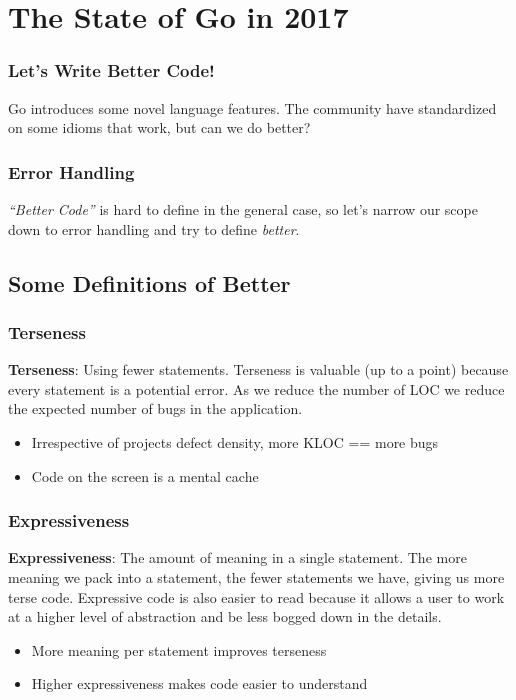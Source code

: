 \documentclass{beamer}
\begin{document}
\section{The State of Go in 2017}

\begin{frame}
  \frametitle{Let's Write Better Code!}
  Go introduces some novel language features.  The community have
  standardized on some idioms that work, but can we do better?
\end{frame}

\begin{frame}
  \frametitle{Error Handling}
  {\it ``Better Code''} is hard to define in the general case, so let's
  narrow our scope down to error handling and try to define
  {\it better}.
\end{frame}

\subsection{Some Definitions of Better}
\begin{frame}
  \frametitle{Terseness}
  {\bf Terseness}: Using fewer statements.
  \vfill
  Terseness is valuable (up to a point) because every statement is a
  potential error.  As we reduce the number of LOC we reduce the
  expected number of bugs in the application.
  \vfill
  \begin{itemize}
  \item Irrespective of projects defect density, more KLOC == more bugs
  \item Code on the screen is a mental cache
  \end{itemize}
\end{frame}

\begin{frame}
  \frametitle{Expressiveness}
  {\bf Expressiveness}: The amount of meaning in a single statement.
  \vfill
  The more meaning we pack into a statement, the fewer statements we
  have, giving us more terse code.  Expressive code is also easier to
  read because it allows a user to work at a higher level of
  abstraction and be less bogged down in the details.
  \vfill
  \begin{itemize}
    \item More meaning per statement improves terseness
    \item Higher expressiveness makes code easier to understand
  \end{itemize}
\end{frame}
\end{document}
